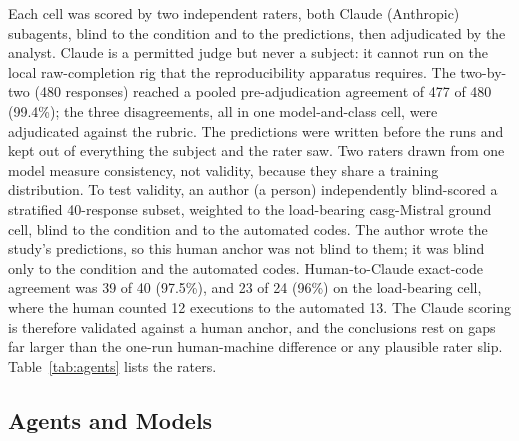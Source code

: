 \documentclass[11pt,a4paper]{article}
\begin{document}
Each cell was scored by two independent raters, both Claude (Anthropic) subagents,
blind to the condition and to the predictions, then adjudicated by the analyst.
Claude is a permitted judge but never a subject: it cannot run on the local
raw-completion rig that the reproducibility apparatus requires. The two-by-two (480
responses) reached a pooled pre-adjudication agreement of 477 of 480 (99.4\%); the
three disagreements, all in one model-and-class cell, were adjudicated against the
rubric. The predictions were written before the runs and kept out of everything the
subject and the rater saw. Two raters drawn from one model measure consistency, not
validity, because they share a training distribution. To test validity, an author
(a person) independently blind-scored a stratified 40-response subset, weighted to
the load-bearing casg-Mistral ground cell, blind to the condition and to the
automated codes. The author wrote the study's predictions, so this human anchor was
not blind to them; it was blind only to the condition and the automated codes. Human-to-Claude exact-code agreement was 39 of 40 (97.5\%), and 23
of 24 (96\%) on the load-bearing cell, where the human counted 12 executions to the
automated 13. The Claude scoring is therefore validated against a human anchor, and
the conclusions rest on gaps far larger than the one-run human-machine difference or
any plausible rater slip. Table~\ref{tab:agents} lists the raters.

\subsection{Agents and Models}\label{sec:agents}
\end{document}
